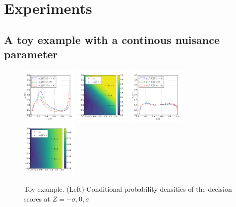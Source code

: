 \documentclass{article}
\theoremstyle{plain}
\begin{document}

\section{Experiments}

\subsection{A toy example with a continous nuisance parameter}
\label{sec:toy}

\begin{figure}
    \begin{center}
        \includegraphics[width=0.245\textwidth]{../figures/f-plain.pdf}
        \includegraphics[width=0.245\textwidth]{../figures/surface-plain.pdf}
        \includegraphics[width=0.245\textwidth]{../figures/f-adversary.pdf}
        \includegraphics[width=0.245\textwidth]{../figures/surface-adversary.pdf}
    \end{center}
    \caption{Toy example.
    (Left) Conditional probability densities of the decision scores at $Z=-\sigma, 0, \sigma$
}
\end{figure}
\end{document}
